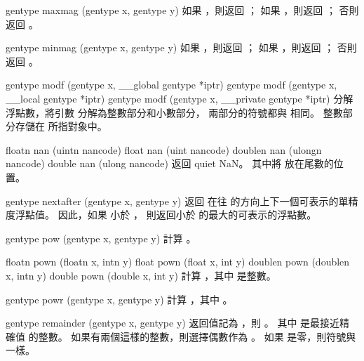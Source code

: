 gentype maxmag (gentype x, gentype y)
\stopbuffer
{}
如果 ，則返回 ；
如果 ，則返回 ；
否則返回 。
\stopbuffer

gentype minmag (gentype x, gentype y)
\stopbuffer
{}
如果 ，則返回 ；
如果 ，則返回 ；
否則返回 。
\stopbuffer

gentype modf (gentype x,
	__global gentype *iptr)
gentype modf (gentype x,
	__local gentype *iptr)
gentype modf (gentype x,
	__private gentype *iptr)
\stopbuffer
{}
分解浮點數，將引數  分解為整數部分和小數部分，
兩部分的符號都與  相同。
整數部分存儲在  所指對象中。
\stopbuffer

floatn nan (uintn nancode)
float nan (uint nancode)
doublen nan (ulongn nancode)
double nan (ulong nancode)
\stopbuffer
{}
返回 quiet NaN。
其中將  放在尾數的位置。
\stopbuffer

gentype nextafter (gentype x,
		gentype y)
\stopbuffer
{}
返回  在往  的方向上下一個可表示的單精度浮點值。
因此，如果  小於 ，
則返回小於  的最大的可表示的浮點數。
\stopbuffer

gentype pow (gentype x, gentype y)
\stopbuffer
{}
計算 。
\stopbuffer

floatn pown (floatn x, intn y)
float pown (float x, int y)
doublen pown (doublen x, intn y)
double pown (double x, int y)
\stopbuffer
{}
計算 ，其中  是整數。
\stopbuffer

gentype powr (gentype x,
		gentype y)
\stopbuffer
{}
計算 ，其中 。
\stopbuffer

gentype remainder (gentype x,
		gentype y)
\stopbuffer
{}
返回值記為 ，則 。
其中  是最接近精確值  的整數。
如果有兩個這樣的整數，則選擇偶數作為 。
如果  是零，則符號與  一樣。
\stopbuffer

